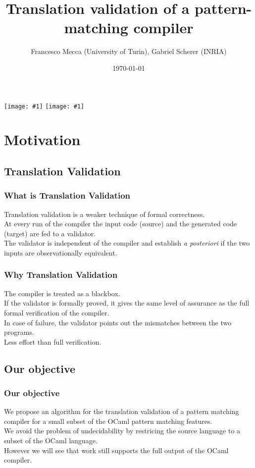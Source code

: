 \documentclass{beamer}
\title{Translation validation of a pattern-matching compiler}
\subtitle{}
\author{Francesco Mecca (University of Turin), Gabriel Scherer (INRIA)}
\date{\today}
\begin{document}

\newcommand{\showface}[1]{\texttt{[image: \#1]}}
\begin{frame}
  \titlepage

\begin{center}
  \showface{pictures/Francesco_Mecca.jpg}
  \showface{pictures/Gabriel_Scherer.jpg}
\end{center}
\end{frame}

\section{Motivation}
\subsection{Translation Validation}

\begin{frame}
  \frametitle{What is Translation Validation}
  Translation validation is a  weaker technique of formal correctness. \\
  At every run of the compiler the input code (source) and the generated code (target) are fed to a
  validator. \\
  The validator is independent of the compiler and establish
  \emph{a posteriori} if the two inputs are observationally
  equivalent.
\end{frame}
\begin{frame}
  \frametitle{Why Translation Validation}
  The compiler is treated as a blackbox. \\
  If the validator is formally proved, it gives the same level of
  assurance as the full formal verification of the compiler. \\
  In case of failure, the validator points out the mismatches between
  the two programs. \\
  Less effort than full verification.
\end{frame}

\subsection{Our objective}
\begin{frame}
  \frametitle{Our objective}
  We propose an algorithm for the translation validation of a pattern
  matching compiler for a small subset of the OCaml pattern
  matching features. \\
  We avoid the problem of undecidability by restricing the source
  language to a subset of the OCaml language.\\
  However we will see that work still supports the full output of the
  OCaml compiler.
\end{frame}
\end{document}
